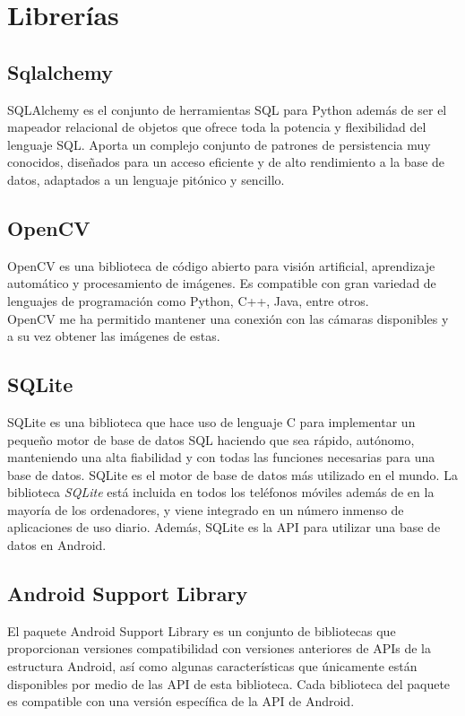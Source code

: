 \section{Librerías}

\subsection{Sqlalchemy}

SQLAlchemy es el conjunto de herramientas SQL para Python además de ser el mapeador relacional de objetos que ofrece toda la potencia y flexibilidad del lenguaje SQL. Aporta un complejo conjunto de patrones de persistencia muy conocidos, diseñados para un acceso eficiente y de alto rendimiento a la base de datos, adaptados a un lenguaje pitónico y sencillo.

\subsection{OpenCV}

OpenCV es una biblioteca de código abierto para visión artificial, aprendizaje automático y procesamiento de imágenes. Es compatible con gran variedad de lenguajes de programación como Python, C++, Java, entre otros.\\
OpenCV me ha permitido mantener una conexión con las cámaras disponibles y a su vez obtener las imágenes de estas.

\subsection{SQLite}

SQLite es una biblioteca que hace uso de lenguaje C para implementar un pequeño motor de base de datos SQL haciendo que sea rápido, autónomo, manteniendo una alta fiabilidad y con todas las funciones necesarias para una base de datos. SQLite es el motor de base de datos más utilizado en el mundo. La biblioteca \textit{SQLite} está incluida en todos los teléfonos móviles además de en la mayoría de los ordenadores, y viene integrado en un número inmenso de aplicaciones de uso diario. Además, SQLite es la API para utilizar una base de datos en Android.

\subsection{Android Support Library}

El paquete Android Support Library es un conjunto de bibliotecas que proporcionan versiones compatibilidad con versiones anteriores de APIs de la estructura Android, así como algunas características que únicamente están disponibles por medio de las API de esta biblioteca. Cada biblioteca del paquete es compatible con una versión específica de la API de Android.

